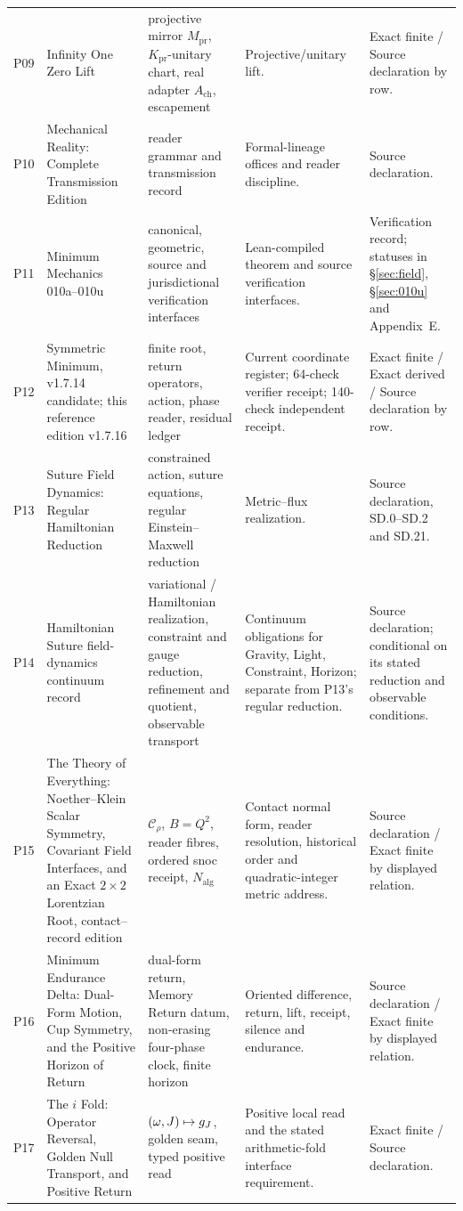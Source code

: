 \documentclass[11pt,a4paper]{article}
\newcommand{\Nalg}{N_{\mathrm{alg}}}\newcommand{\Fac}{\mathrm{Fac}_G}
\newcommand{\Mpr}{M_{\mathrm{pr}}}\newcommand{\Kpr}{K_{\mathrm{pr}}}\newcommand{\Upr}{U_{\mathrm{pr}}}
\newcommand{\Ach}{A_{\mathrm{ch}}}\newcommand{\Zch}{Z_{\mathrm{ch}}}
\theoremstyle{plain}
\theoremstyle{definition}
\theoremstyle{remark}
\begin{document}
{\begin{longtable}{@{}>{\raggedright\arraybackslash}p{0.8cm}>{\raggedright\arraybackslash}p{4.4cm}>{\raggedright\arraybackslash}p{4.4cm}>{\raggedright\arraybackslash}p{3.1cm}>{\raggedright\arraybackslash}p{2.1cm}@{}}
P09 & Infinity One Zero Lift & projective mirror $\Mpr$, $\Kpr$-unitary chart, real adapter $\Ach$, escapement & Projective/unitary lift. & Exact finite / Source declaration by row.\\
P10 & Mechanical Reality: Complete Transmission Edition & reader grammar and transmission record & Formal-lineage offices and reader discipline. & Source declaration.\\
P11 & Minimum Mechanics 010a--010u & canonical, geometric, source and jurisdictional verification interfaces & Lean-compiled theorem and source verification interfaces. & Verification record; statuses in \S\ref{sec:field}, \S\ref{sec:010u} and Appendix~E.\\
P12 & Symmetric Minimum, v1.7.14 candidate; this reference edition v1.7.16 & finite root, return operators, action, phase reader, residual ledger & Current coordinate register; 64-check verifier receipt; 140-check independent receipt. & Exact finite / Exact derived / Source declaration by row.\\
P13 & Suture Field Dynamics: Regular Hamiltonian Reduction & constrained action, suture equations, regular Einstein--Maxwell reduction & Metric--flux realization. & Source declaration, SD.0--SD.2 and SD.21.\\
P14 & Hamiltonian Suture field-dynamics continuum record & variational / Hamiltonian realization, constraint and gauge reduction, refinement and quotient, observable transport & Continuum obligations for Gravity, Light, Constraint, Horizon; separate from P13's regular reduction. & Source declaration; conditional on its stated reduction and observable conditions.\\
P15 & The Theory of Everything: Noether--Klein Scalar Symmetry, Covariant Field Interfaces, and an Exact $2\times2$ Lorentzian Root, contact--record edition & $\mathcal C_\rho$, $B=Q^2$, reader fibres, ordered snoc receipt, $\Nalg$ & Contact normal form, reader resolution, historical order and quadratic-integer metric address. & Source declaration / Exact finite by displayed relation.\\
P16 & Minimum Endurance Delta: Dual-Form Motion, Cup Symmetry, and the Positive Horizon of Return & dual-form return, Memory Return datum, non-erasing four-phase clock, finite horizon & Oriented difference, return, lift, receipt, silence and endurance. & Source declaration / Exact finite by displayed relation.\\
P17 & The $i$ Fold: Operator Reversal, Golden Null Transport, and Positive Return & $(\omega,J)\mapsto g_J$, golden seam, typed positive read & Positive local read and the stated arithmetic-fold interface requirement. & Exact finite / Source declaration.\\

\end{longtable}}
\end{document}
